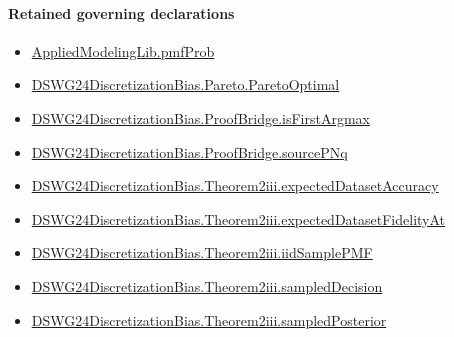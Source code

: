 \documentclass[10pt]{article}
\begin{document}
\paragraph{Retained governing declarations}
\begin{itemize}\raggedright
\item \hyperlink{governing-declaration-9c38d53b9d664221}{Applied\allowbreak{}Modeling\allowbreak{}Lib.\allowbreak{}pmf\allowbreak{}Prob}
\item \hyperlink{governing-declaration-90962900f461a9f9}{DSWG24\allowbreak{}Discretization\allowbreak{}Bias.\allowbreak{}Pareto.\allowbreak{}Pareto\allowbreak{}Optimal}
\item \hyperlink{governing-declaration-af44c4b45082ddcb}{DSWG24\allowbreak{}Discretization\allowbreak{}Bias.\allowbreak{}Proof\allowbreak{}Bridge.\allowbreak{}is\allowbreak{}First\allowbreak{}Argmax}
\item \hyperlink{governing-declaration-9631b3d6800a2bd3}{DSWG24\allowbreak{}Discretization\allowbreak{}Bias.\allowbreak{}Proof\allowbreak{}Bridge.\allowbreak{}source\allowbreak{}P\allowbreak{}Nq}
\item \hyperlink{governing-declaration-daac633422a44729}{DSWG24\allowbreak{}Discretization\allowbreak{}Bias.\allowbreak{}Theorem2iii.\allowbreak{}expected\allowbreak{}Dataset\allowbreak{}Accuracy}
\item \hyperlink{governing-declaration-8158479406f1d885}{DSWG24\allowbreak{}Discretization\allowbreak{}Bias.\allowbreak{}Theorem2iii.\allowbreak{}expected\allowbreak{}Dataset\allowbreak{}Fidelity\allowbreak{}At}
\item \hyperlink{governing-declaration-b906fbb2f231ab40}{DSWG24\allowbreak{}Discretization\allowbreak{}Bias.\allowbreak{}Theorem2iii.\allowbreak{}iid\allowbreak{}Sample\allowbreak{}PMF}
\item \hyperlink{governing-declaration-05d42de5dba2851d}{DSWG24\allowbreak{}Discretization\allowbreak{}Bias.\allowbreak{}Theorem2iii.\allowbreak{}sampled\allowbreak{}Decision}
\item \hyperlink{governing-declaration-457b4184b0081169}{DSWG24\allowbreak{}Discretization\allowbreak{}Bias.\allowbreak{}Theorem2iii.\allowbreak{}sampled\allowbreak{}Posterior}
\end{itemize}
\end{document}
